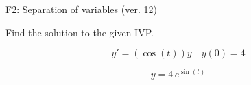 \begin{exercise}
  \begin{exerciseTitle}F2: Separation of variables (ver. 12)\end{exerciseTitle}
  \begin{exerciseStatement}
    
Find the solution to the given IVP.

    
\[y'=( \cos\left(t\right) )y\hspace{1em} y(0)= 4\]

  \end{exerciseStatement}
  \begin{exerciseAnswer}
    
\[y= 4 \, e^{\sin\left(t\right)}\]

  \end{exerciseAnswer}
\end{exercise}